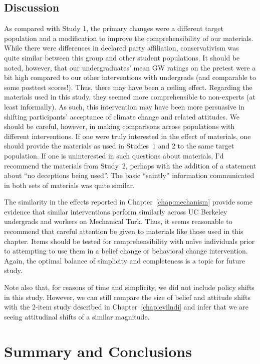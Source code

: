 \subsection{Discussion}

As compared with Study 1, the primary changes were a different target population
and a modification to improve the comprehensibility of our materials. While
there were differences in declared party affiliation, conservativism was quite
similar between this group and other student populations. It should be noted,
however, that our undergraduates' mean GW ratings on the pretest were a bit high
compared to our other interventions with undergrads (and comparable to some
posttest scores!). Thus, there may have been a ceiling effect. Regarding the
materials used in this study, they seemed more comprehensible to non-experts (at
least informally). As such, this intervention may have been more persuasive in
shifting participants' acceptance of climate change and related attitudes. We
should be careful, however, in making comparisons across populations with
different interventions.  If one were truly interested in the effect of
materials, one should provide the materials as used in Studies~1 and 2 to the
same target population. If one is uninterested in such questions about
materials, I'd recommend the materials from Study~2, perhaps with the addition
of a statement about “no deceptions being used”. The basic “saintly” information
communicated in both sets of materials was quite similar.

The similarity in the effects reported in Chapter~\ref{chap:mechanism} provide
some evidence that similar interventions perform similarly across UC Berkeley
undergrads and workers on Mechanical Turk.  Thus, it seems reasonable to
recommend that careful attention be given to materials like those used in this
chapter. Items should be tested for comprehensibility with naïve individuals
prior to attempting to use them in a belief change or behavioral change
intervention. Again, the optimal balance of simplicity and completeness is a
topic for future study.

Note also that, for reasons of time and simplicity, we did not include policy
shifts in this study. However, we can still compare the size of belief and
attitude shifts with the 2-item study described in Chapter~\ref{chap:evilndi}
and infer that we are seeing attitudinal shifts of a similar magnitude.

\section{Summary and Conclusions}

